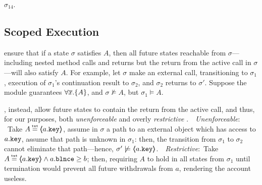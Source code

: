 $\sigma_{14}$.

 
 \subsection{Scoped Execution}
 \label{sect:bounded}

  ensure that if a state $\sigma$ satisfies $A$, then all future states reachable from $\sigma$—including nested method calls and returns but   the return from the active call in $\sigma$—will also satisfy $A$. For example, let $\sigma$ make an external call, transitioning to $\sigma_1$,    execution of $\sigma_1$'s continuation result  to $\sigma_2$, and $\sigma_2$ returns  to $\sigma'$. 
Suppose the module guarantees $\forall {\overline{x}}.{{\{}}{A}{{\}}}$, and $\sigma \not\models A$, but $\sigma_1 \models A$. 
 
%
 \cite{liskov94behavioral,usinghistory,Cohen10}, instead, allow future states to contain the return from the active call, and thus,   for our purposes,  both
 \emph{unenforceable} and overly \emph{restrictive} .\ \  \emph{Unenforceable}: \ Take $A \txteq \inside{a.\prg{key}}$,  assume  in $\sigma$ a path to an external object which has access to $a.\mbox{\normalfont{\texttt{key}}}$, assume that path is unknown in $\sigma_1$: then, the transition from $\sigma_1$ to $\sigma_2$ cannot eliminate that path—hence, $\sigma' \not\models \langle\!\!\langle a.\mbox{\normalfont{\texttt{key}}} \rangle\!\!\rangle$.\ \  \emph{Restrictive}:\ Take $A \txteq \inside{a.\prg{key}}\wedge a.\prg{blnce}\geq b$; then,  requiring  $A$   to hold in all states from $\sigma_1$ until termination would prevent all future withdrawals from $a$, rendering the account useless.

